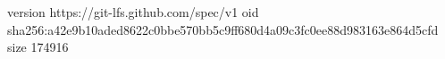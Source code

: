 version https://git-lfs.github.com/spec/v1
oid sha256:a42e9b10aded8622c0bbe570bb5c9ff680d4a09c3fc0ee88d983163e864d5cfd
size 174916
